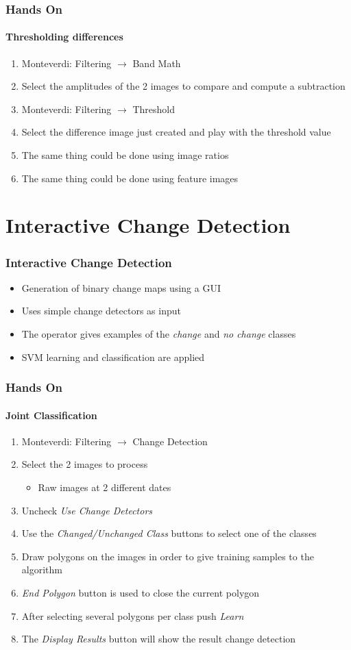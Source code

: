 \documentclass[compress]{beamer}
\begin{document}
\begin{frame}
  \frametitle{Hands On}
  \framesubtitle{Thresholding differences}
  \begin{enumerate}
  \item Monteverdi: Filtering $\rightarrow$ Band Math
  \item Select the amplitudes of the 2 images to compare and compute a subtraction
  \item Monteverdi: Filtering $\rightarrow$ Threshold
  \item Select the difference image just created and play with the
    threshold value
  \item The same thing could be done using image ratios
  \item The same thing could be done using feature images
  \end{enumerate}
\end{frame}


\section[Application]{Interactive Change Detection}

\begin{frame}
  \frametitle{Interactive Change Detection}
  \begin{itemize}
    \item Generation of binary change maps using a GUI
    \item Uses simple change detectors as input
    \item The operator gives examples of the {\em change} and {\em no
    change} classes
    \item SVM learning and classification are applied
  \end{itemize}
\end{frame}


\begin{frame}
  \frametitle{Hands On}
  \framesubtitle{Joint Classification}
  \begin{enumerate}
  \item Monteverdi: Filtering $\rightarrow$ Change Detection
  \item Select the 2 images to process
    \begin{itemize}
    \item Raw images at 2 different dates
    \end{itemize}
  \item Uncheck {\em Use Change Detectors}
  \item Use the {\em Changed/Unchanged Class} buttons to select one of
    the classes
  \item Draw polygons on the images in order to give training samples
    to the algorithm
  \item {\em End Polygon} button is used to close the current polygon
  \item After selecting several polygons per class push {\em Learn}
  \item The {\em Display Results} button will show the result change detection
  \end{enumerate}
\end{frame}
\end{document}
